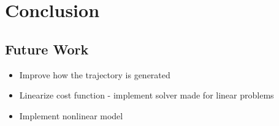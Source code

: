 \chapter{Conclusion}


\section{Future Work}

\begin{itemize}
	\item Improve how the trajectory is generated
	\item Linearize cost function - implement solver made for linear problems
	\item Implement nonlinear model
\end{itemize}